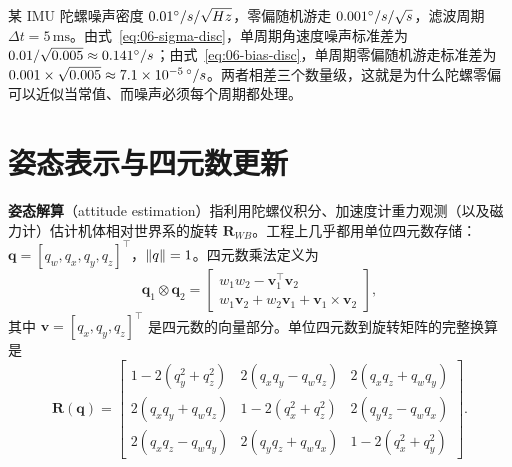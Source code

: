 \begin{example}[把手册参数变成滤波器参数]
某 IMU 陀螺噪声密度 $0.01^\circ/s/\sqrt{Hz}$，零偏随机游走 $0.001^\circ/s/\sqrt{s}$，滤波周期 $\Delta t=5\,\mathrm{ms}$。由式~\eqref{eq:06-sigma-disc}，单周期角速度噪声标准差为 $0.01/\sqrt{0.005}\approx0.141^\circ/s$；由式~\eqref{eq:06-bias-disc}，单周期零偏随机游走标准差为 $0.001\times\sqrt{0.005}\approx7.1\times10^{-5}\,^\circ/s$。两者相差三个数量级，这就是为什么陀螺零偏可以近似当常值、而噪声必须每个周期都处理。
\end{example}

\section{姿态表示与四元数更新}\label{sec:06-quaternion}

\textbf{姿态解算}（attitude estimation）指利用陀螺仪积分、加速度计重力观测（以及磁力计）估计机体相对世界系的旋转 $\bm{R}_{WB}$。工程上几乎都用单位四元数存储：$\bm{q}=[q_w,q_x,q_y,q_z]^{\top}$，$\left\lVert q \right\rVert=1$。四元数乘法定义为
\begin{equation}
  \bm{q}_1\otimes\bm{q}_2
  = \begin{bmatrix}
    w_1w_2-\bm{v}_1^{\top}\bm{v}_2\\
    w_1\bm{v}_2+w_2\bm{v}_1+\bm{v}_1\times\bm{v}_2
  \end{bmatrix},
  \label{eq:06-qmul}
\end{equation}
其中 $\bm{v}=[q_x,q_y,q_z]^{\top}$ 是四元数的向量部分。单位四元数到旋转矩阵的完整换算是
\begin{equation}
  \bm{R}(\bm{q}) = \begin{bmatrix}
    1-2(q_y^{2}+q_z^{2}) & 2(q_xq_y-q_wq_z) & 2(q_xq_z+q_wq_y)\\
    2(q_xq_y+q_wq_z) & 1-2(q_x^{2}+q_z^{2}) & 2(q_yq_z-q_wq_x)\\
    2(q_xq_z-q_wq_y) & 2(q_yq_z+q_wq_x) & 1-2(q_x^{2}+q_y^{2})
  \end{bmatrix}.
  \label{eq:06-q2R}
\end{equation}

